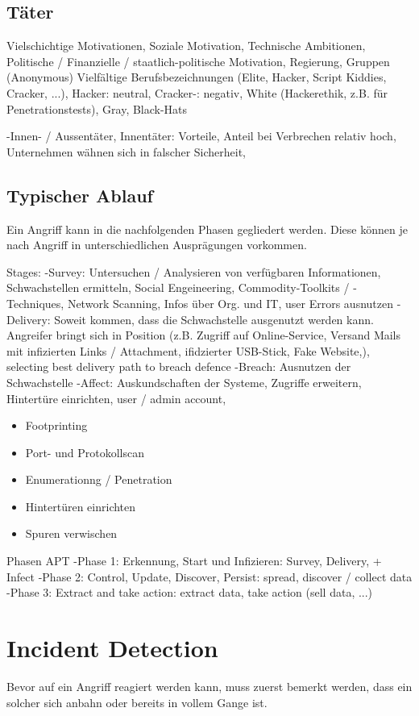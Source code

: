 \subsection{Täter}
Vielschichtige Motivationen, Soziale Motivation, Technische Ambitionen, Politische / Finanzielle / staatlich-politische Motivation, Regierung, Gruppen (Anonymous)
Vielfältige Berufsbezeichnungen (Elite, Hacker, Script Kiddies, Cracker, ...), Hacker: neutral, Cracker-: negativ, White (Hackerethik, z.B. für Penetrationstests), Gray, Black-Hats

-Innen- / Aussentäter, Innentäter: Vorteile, Anteil bei Verbrechen relativ hoch, Unternehmen wähnen sich in falscher Sicherheit,


\subsection{Typischer Ablauf}
Ein Angriff kann in die nachfolgenden Phasen gegliedert werden. Diese können je nach Angriff in unterschiedlichen Ausprägungen vorkommen.

Stages:
-Survey: Untersuchen / Analysieren von verfügbaren Informationen, Schwachstellen ermitteln, Social Engeineering, Commodity-Toolkits / -Techniques, Network Scanning, Infos über Org. und IT, user Errors ausnutzen
-Delivery: Soweit kommen, dass die Schwachstelle ausgenutzt werden kann. Angreifer bringt sich in Position (z.B. Zugriff auf Online-Service, Versand Mails mit infizierten Links / Attachment, ifidzierter USB-Stick, Fake Website,), selecting best delivery path to breach defence
-Breach: Ausnutzen der Schwachstelle
-Affect: Auskundschaften der Systeme, Zugriffe erweitern, Hintertüre einrichten, user / admin account,

\begin{itemize}
  \item Footprinting
  \item Port- und Protokollscan
  \item Enumerationng / Penetration
  \item Hintertüren einrichten
  \item Spuren verwischen
\end{itemize}

Phasen APT
-Phase 1: Erkennung, Start und Infizieren: Survey, Delivery, + Infect
-Phase 2: Control, Update, Discover, Persist: spread, discover / collect data
-Phase 3: Extract and take action: extract data, take action (sell data, ...)


\section{Incident Detection}
Bevor auf ein Angriff reagiert werden kann, muss zuerst bemerkt werden, dass ein solcher sich anbahn oder bereits in vollem Gange ist.

